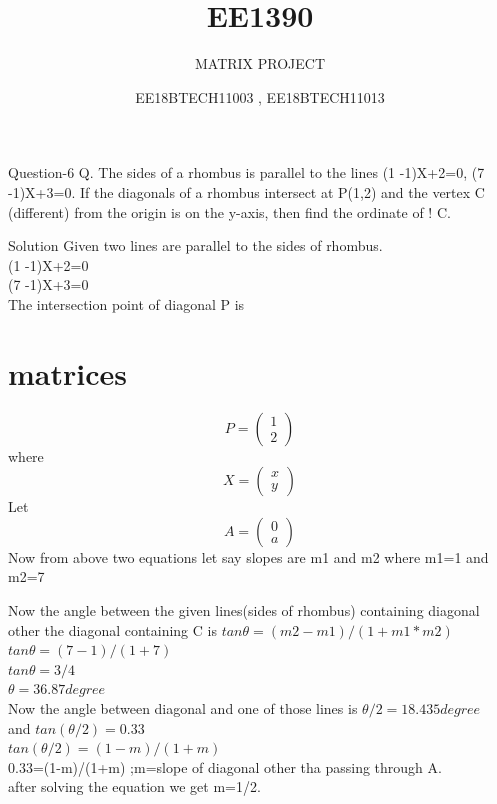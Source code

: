 \documentclass{beamer}
\title{EE1390}
\subtitle{MATRIX PROJECT}
\author{EE18BTECH11003 , EE18BTECH11013}
\date{}
\begin{document}
\begin{frame}
\titlepage
\end{frame}
\begin{frame}{Question-6}
Q. The sides of a rhombus is parallel to the lines
     (1 -1)X+2=0,
     (7 -1)X+3=0.
   If the diagonals of a rhombus intersect at 
     P(1,2)
   and the vertex C (different) from the origin is
   on the y-axis, then find the ordinate of ! C.
\end{frame}

\begin{frame}{Solution}
Given two lines are parallel to the sides of rhombus.\\
(1 -1)X+2=0 \\ (7 -1)X+3=0\\
The intersection point of diagonal P is
\section{matrices}
\[
P=\begin{pmatrix}
1\\
2
\end{pmatrix}
\]
where 
\[
X=\begin{pmatrix}
x \\
y
\end{pmatrix}
\]
Let 
\[
A=\begin{pmatrix}
0\\
a
\end{pmatrix}
\]
Now from above two equations let say slopes are m1 and m2
where m1=1 and m2=7 
\end{frame}
\begin{frame}
Now the angle between the given lines(sides of rhombus) containing diagonal other the diagonal containing C is 
 $tan\theta =(m2-m1)/(1+m1*m2)$\\
 $tan\theta =(7-1)/(1+7)$\\
 $tan\theta =3/4$\\
 $\theta =36.87 degree$\\
 Now the angle between diagonal and one of those lines is $\theta/2=18.435 degree$\\
 and $tan(\theta/2)=0.33$\\
 $tan(\theta/2)=(1-m)/(1+m)$\\
 0.33=(1-m)/(1+m) ;m=slope of diagonal other tha passing through A.\\
 after solving the equation we get m=1/2.
\end{frame}
\end{document}
